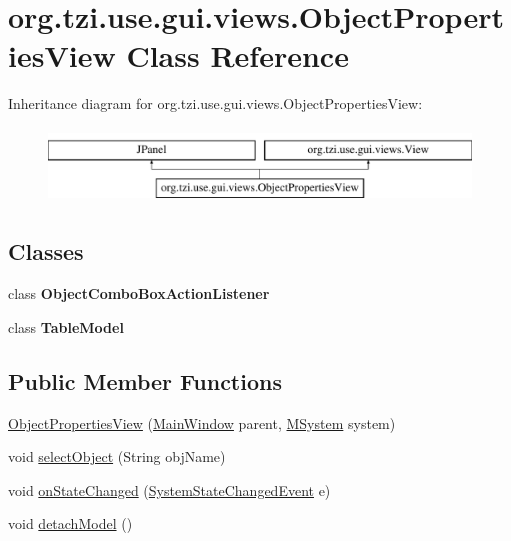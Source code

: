 \hypertarget{classorg_1_1tzi_1_1use_1_1gui_1_1views_1_1_object_properties_view}{\section{org.\-tzi.\-use.\-gui.\-views.\-Object\-Properties\-View Class Reference}
\label{classorg_1_1tzi_1_1use_1_1gui_1_1views_1_1_object_properties_view}
}
Inheritance diagram for org.\-tzi.\-use.\-gui.\-views.\-Object\-Properties\-View\-:\begin{figure}[H]
\begin{center}
\leavevmode
\includegraphics[height=2.000000cm]{classorg_1_1tzi_1_1use_1_1gui_1_1views_1_1_object_properties_view}
\end{center}
\end{figure}
\subsection*{Classes}
\begin{DoxyCompactItemize}
\item 
class {\bfseries Object\-Combo\-Box\-Action\-Listener}
\item 
class {\bfseries Table\-Model}
\end{DoxyCompactItemize}
\subsection*{Public Member Functions}
\begin{DoxyCompactItemize}
\item 
\hyperlink{classorg_1_1tzi_1_1use_1_1gui_1_1views_1_1_object_properties_view_a0608f3780860c795522635cbdf023b63}{Object\-Properties\-View} (\hyperlink{classorg_1_1tzi_1_1use_1_1gui_1_1main_1_1_main_window}{Main\-Window} parent, \hyperlink{classorg_1_1tzi_1_1use_1_1uml_1_1sys_1_1_m_system}{M\-System} system)
\item 
void \hyperlink{classorg_1_1tzi_1_1use_1_1gui_1_1views_1_1_object_properties_view_a5e6c2c292ef9aea8cf51c99bede6588e}{select\-Object} (String obj\-Name)
\item 
void \hyperlink{classorg_1_1tzi_1_1use_1_1gui_1_1views_1_1_object_properties_view_a2fe8818dcbcde2d0adb0bf91ac89d6f7}{on\-State\-Changed} (\hyperlink{interfaceorg_1_1tzi_1_1use_1_1uml_1_1sys_1_1events_1_1tags_1_1_system_state_changed_event}{System\-State\-Changed\-Event} e)
\item 
void \hyperlink{classorg_1_1tzi_1_1use_1_1gui_1_1views_1_1_object_properties_view_a46f38343674de1a0917d2f5629124fdc}{detach\-Model} ()
\end{DoxyCompactItemize}


